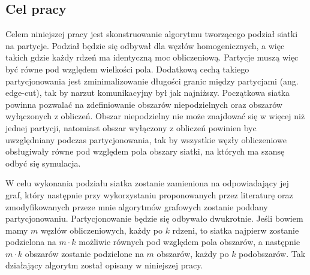 \subsection{Cel pracy}
Celem niniejszej pracy jest skonstruowanie algorytmu tworzącego podział siatki na partycje.
Podział będzie się odbywał dla węzłów homogenicznych, a więc takich gdzie każdy rdzeń ma identyczną moc obliczeniową.
Partycje muszą więc być równe pod względem wielkości pola.
Dodatkową cechą takiego partycjonowania jest zminimalizowanie długości granic między partycjami (ang. edge-cut),
tak by narzut komunikacyjny był jak najniższy.
Początkowa siatka powinna pozwalać na zdefiniowanie obszarów niepodzielnych oraz obszarów wyłączonych z obliczeń.
Obszar niepodzielny nie może znajdować się w więcej niż jednej partycji, natomiast
obszar wyłączony z obliczeń powinien byc uwzględniany podczas partycjonowania, tak by wszystkie węzły obliczeniowe
obsługiwały równe pod względem pola obszary siatki, na których ma szansę odbyć się symulacja.

W celu wykonania podziału siatka zostanie zamieniona na odpowiadający jej graf, który
następnie przy wykorzystaniu proponowanych przez literaturę oraz zmodyfikowanych przeze mnie algorytmów grafowych
zostanie poddany partycjonowaniu.
Partycjonowanie będzie się odbywało dwukrotnie.
Jeśli bowiem mamy $m$ węzłów obliczeniowych, każdy po $k$ rdzeni, to siatka najpierw zostanie podzielona na
$m \cdot k$ możliwie równych pod względem pola obszarów, a następnie $m \cdot k$ obszarów zostanie podzielone
na $m$ obszarów, każdy po $k$ podobszarów.
Tak działający algorytm został opisany w niniejszej pracy.